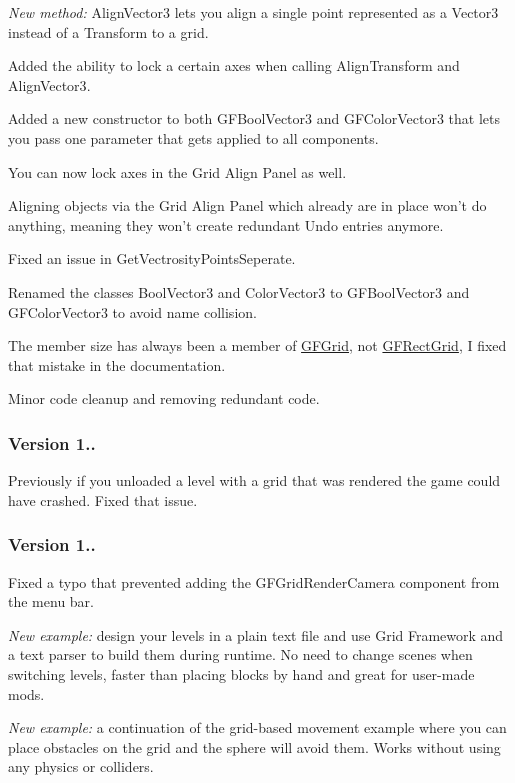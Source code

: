 \begin{DoxyItemize}
\item {\itshape New method\+:} {\ttfamily Align\+Vector3} lets you align a single point represented as a {\ttfamily Vector3} instead of a {\ttfamily Transform} to a grid.
\item Added the ability to lock a certain axes when calling {\ttfamily Align\+Transform} and {\ttfamily Align\+Vector3}.
\item Added a new constructor to both {\ttfamily G\+F\+Bool\+Vector3} and {\ttfamily G\+F\+Color\+Vector3} that lets you pass one parameter that gets applied to all components.
\item You can now lock axes in the Grid Align Panel as well.
\item Aligning objects via the Grid Align Panel which already are in place won't do anything, meaning they won't create redundant Undo entries anymore.
\item Fixed an issue in {\ttfamily Get\+Vectrosity\+Points\+Seperate}.
\item Renamed the classes {\ttfamily Bool\+Vector3} and {\ttfamily Color\+Vector3} to {\ttfamily G\+F\+Bool\+Vector3} and {\ttfamily G\+F\+Color\+Vector3} to avoid name collision.
\item The member {\ttfamily size} has always been a member of {\ttfamily \hyperlink{class_g_f_grid}{G\+F\+Grid}}, not {\ttfamily \hyperlink{class_g_f_rect_grid}{G\+F\+Rect\+Grid}}, I fixed that mistake in the documentation.
\item Minor code cleanup and removing redundant code.
\end{DoxyItemize}

\subsubsection*{Version 1..}


\begin{DoxyItemize}
\item Previously if you unloaded a level with a grid that was rendered the game could have crashed. Fixed that issue.
\end{DoxyItemize}

\subsubsection*{Version 1..}


\begin{DoxyItemize}
\item Fixed a typo that prevented adding the {\ttfamily G\+F\+Grid\+Render\+Camera} component from the menu bar.
\item {\itshape New example\+:} design your levels in a plain text file and use Grid Framework and a text parser to build them during runtime. No need to change scenes when switching levels, faster than placing blocks by hand and great for user-\/made mods.
\item {\itshape New example\+:} a continuation of the grid-\/based movement example where you can place obstacles on the grid and the sphere will avoid them. Works without using any physics or colliders.
\end{DoxyItemize}

